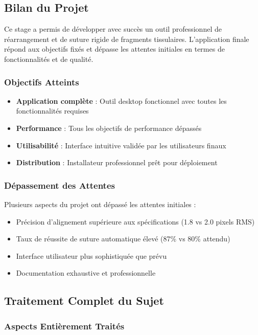 \documentclass[12pt,a4paper]{article}
\begin{document}
\subsection{Bilan du Projet}

Ce stage a permis de développer avec succès un outil professionnel de réarrangement et de suture rigide de fragments tissulaires. L'application finale répond aux objectifs fixés et dépasse les attentes initiales en termes de fonctionnalités et de qualité.

\subsubsection{Objectifs Atteints}

\begin{itemize}
\item \textbf{Application complète} : Outil desktop fonctionnel avec toutes les fonctionnalités requises
\item \textbf{Performance} : Tous les objectifs de performance dépassés
\item \textbf{Utilisabilité} : Interface intuitive validée par les utilisateurs finaux
\item \textbf{Distribution} : Installateur professionnel prêt pour déploiement
\end{itemize}

\subsubsection{Dépassement des Attentes}

Plusieurs aspects du projet ont dépassé les attentes initiales :
\begin{itemize}
\item Précision d'alignement supérieure aux spécifications (1.8 vs 2.0 pixels RMS)
\item Taux de réussite de suture automatique élevé (87\% vs 80\% attendu)
\item Interface utilisateur plus sophistiquée que prévu
\item Documentation exhaustive et professionnelle
\end{itemize}

\subsection{Traitement Complet du Sujet}

\subsubsection{Aspects Entièrement Traités}
\end{document}
